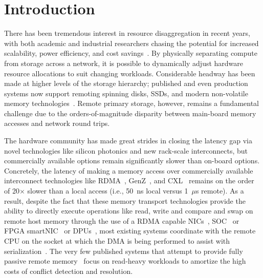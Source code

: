 \section{Introduction}

There has been tremendous interest in resource disaggregation in recent years,
with both academic and industrial researchers chasing the potential for
increased scalability, power efficiency, and cost
savings~\cite{fastswap,rethinking,the-machine,requirements,clio-arxiv,firebox,leap,zombieland,storm,aifm,legoos,supernic}.
By physically separating compute from storage across a network, it is possible
to dynamically adjust hardware resource allocations to suit changing workloads.
Considerable headway has been made at higher levels of the storage hierarchy;
published and even production systems now support remoting spinning disks, SSDs,
and modern non-volatile memory technologies~\cite{decible}.  Remote primary
storage, however, remains a fundamental challenge due to the orders-of-magnitude
disparity between main-board memory accesses and network round trips.



The hardware community has made great strides in closing the latency
gap via novel technologies like silicon photonics and new rack-scale
interconnects, but commercially available options remain significantly
slower than on-board options.  Concretely, the latency of making a
memory access over commercially available interconnect technologies
like RDMA~\cite{infiniband-spec}, GenZ~\cite{genz}, and CXL~\cite{cxl}
remains on the order of 20$\times$ slower than a local access (i.e.,
50~ns local versus 1~$\mu$s remote).  As a result, despite the fact
that these memory transport technologies provide the ability to
directly execute operations like read, write and compare and swap on
remote host memory through the use of a RDMA capable
NICs~\cite{connectx}, SOC~\cite{cavium} or FPGA
smartNIC~\cite{corundum,kv-direct} or DPUs~\cite{fungible}, most
existing systems coordinate with the remote CPU on the socket at which
the DMA is being performed to assist with
serialization~\cite{cliquemap,erpc,herd,sonuma,storm}.  The very few
published systems that attempt to provide fully passive remote
memory~\cite{reigons,clover} focus on read-heavy workloads to
amortize the high costs of conflict detection and resolution.

